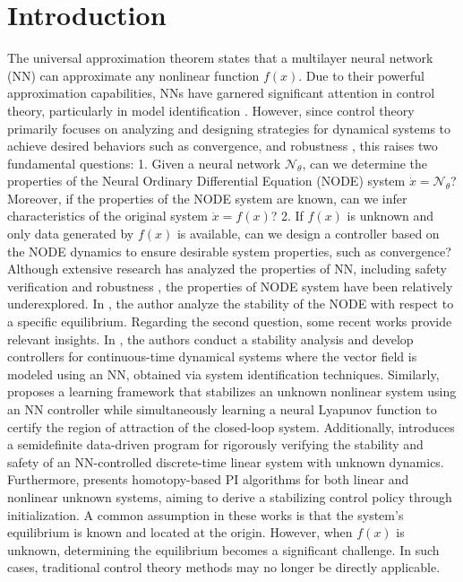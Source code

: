 \documentclass[journal,twoside,web]{ieeecolor}
\begin{document}
\section{Introduction}
The universal approximation theorem \cite{hornik1989multilayer} states that a multilayer neural network (NN) can approximate any nonlinear function $f(x)$. Due to their powerful approximation capabilities, NNs have garnered significant attention in control theory, particularly in model identification \cite{chen1990non,wang2017new}. However, since control theory primarily focuses on analyzing and designing strategies for dynamical systems to achieve desired behaviors such as convergence, and robustness \cite{khalil2002control}, this raises two fundamental questions: 1. Given a neural network $\mathcal{N}_{\theta}$, can we determine the properties of the Neural Ordinary Differential Equation (NODE) system $\dot{x}=\mathcal{N}_{\theta}$? Moreover, if the properties of the NODE system are known, can we infer characteristics of the original system $\dot{x}=f(x)$? 2. If $f(x)$ is unknown and only data generated by $f(x)$ is available, can we design a controller based on the NODE dynamics to ensure desirable system properties, such as convergence? Although extensive research has analyzed the properties of NN, including safety verification and robustness \cite{fazlyab2020safety}, the properties of NODE system have been relatively underexplored. In \cite{kang2021stable}, the author analyze the stability of the NODE with respect to a specific equilibrium. Regarding the second question, some recent works provide relevant insights. In \cite{samanipour2023stability}, the authors conduct a stability analysis and develop controllers for continuous-time dynamical systems where the vector field is modeled using an NN, obtained via system identification techniques. Similarly, \cite{zhou2022neural} proposes a learning framework that stabilizes an unknown nonlinear system using an NN controller while simultaneously learning a neural Lyapunov function to certify the region of attraction of the closed-loop system. %
Additionally, \cite{wang2023model} introduces a semidefinite data-driven program for rigorously verifying the stability and safety of an NN-controlled discrete-time linear system with unknown dynamics. Furthermore, \cite{chen2023adaptive} presents homotopy-based PI algorithms for both linear and nonlinear unknown systems, aiming to derive a stabilizing control policy through initialization. A common assumption in these works is that the system's equilibrium is known and located at the origin. However, when $f(x)$ is unknown,
determining the equilibrium becomes a significant challenge. In such cases, traditional control theory methods may no longer be directly applicable.
\end{document}
